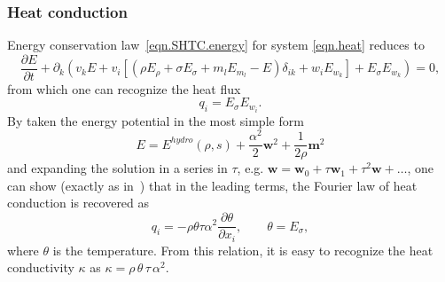 \documentclass[twoside]{article}
\newcommand{\ww}{{\boldsymbol{w}}}
\newcommand{\mm}{{\boldsymbol{m}}}
\newcommand{\ted}{E} %
\newcommand{\pd}{\partial}
\begin{document}


\subsubsection{Heat conduction}

Energy conservation law~\eqref{eqn.SHTC.energy} for system \eqref{eqn.heat} 
reduces to
\begin{equation}\label{eqn.heat.energy.examp}
\frac{\pd \ted}{\pd t} + \pd_k ( v_k \ted 
+ v_i [ ( \rho \ted_\rho  + \sigma\ted_\sigma + m_l\ted_{m_l} - \ted) 
\delta_{ik} + w_i\ted_{w_k}] + \ted_{\sigma} \ted_{w_k} 
)=0, 
\end{equation}
from which one can recognize the heat flux
\begin{equation}\label{eqn.heat.flux}
q_i = \ted_\sigma \ted_{w_i}.
\end{equation}
By taken the energy potential in the most simple form
\begin{equation}\label{eqn.heat.E}
E = E^{hydro}(\rho,s) + \frac{\alpha^2}{2}\ww^2 + \frac{1}{2\rho} \mm^2
\end{equation}
and expanding the solution in a series in $ \tau $, e.g. $ \ww = \ww_0 + \tau 
\ww_1 
+ \tau^2\ww + \ldots $, one can show (exactly as in~\cite{DPRZ2016}) that in 
the leading terms, the Fourier law of heat conduction is recovered as
\begin{equation}\label{eqn.Fourier.law}
q_i = -\rho \theta \tau \alpha^2 \frac{\pd \theta}{\pd x_i}, \qquad \theta = 
\ted_\sigma,
\end{equation}
where $ \theta $ is the temperature. From this relation, it is easy to 
recognize the heat conductivity $ \kappa $ as $ \kappa = \rho\, \theta\, \tau \,
\alpha^2 $.
\end{document}
